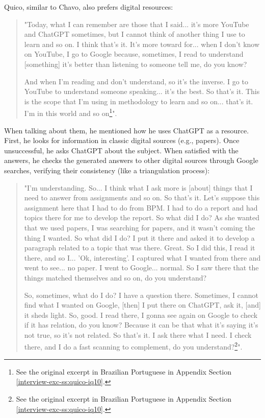 Quico, similar to Chavo, also prefers digital resources:
\begin{quote}
    "Today, what I can remember are those that I said... it's more YouTube and ChatGPT sometimes, but I cannot think of another thing I use to learn and so on. I think that's it. It's more toward for... when I don't know on YouTube, I go to Google because, sometimes, I read to understand [something] it's better than listening to someone tell me, do you know?

    And when I'm reading and don't understand, so it's the inverse. I go to YouTube to understand someone speaking... it's the best. So that's it. This is the scope that I'm using in methodology to learn and so on... that's it. I'm in this world and so on\footnote{See the original excerpt in Brazilian Portuguese in Appendix Section \ref{interview-exc-ss:quico-iq10}.}".
\end{quote}
When talking about them, he mentioned how he uses ChatGPT as a resource. First, he looks for information in classic digital sources (e.g., papers). Once unsuccessful, he asks ChatGPT about the subject. When satisfied with the answers, he checks the generated answers to other digital sources through Google searches, verifying their consistency (like a triangulation process):
\begin{quote}
    "I'm understanding. So... I think what I ask more is [about] things that I need to answer from assignments and so on. So that's it. Let's suppose this assignment here that I had to do from \gls{BPM}. I had to do a report and had topics there for me to develop the report. So what did I do? As she wanted that we used papers, I was searching for papers, and it wasn't coming the thing I wanted. So what did I do? I put it there and asked it to develop a paragraph related to a topic that was there. Great. So I did this, I read it there, and so I... 'Ok, interesting'. I captured what I wanted from there and went to see... no paper. I went to Google... normal. So I saw there that the things matched themselves and so on, do you understand?

    So, sometimes, what do I do? I have a question there. Sometimes, I cannot find what I wanted on Google, [then] I put there on ChatGPT, ask it, [and] it sheds light. So, good. I read there, I gonna see again on Google to check if it has relation, do you know? Because it can be that what it's saying it's not true, so it's not related. So that's it. I ask there what I need. I check there, and I do a fast scanning to complement, do you understand?\footnote{See the original excerpt in Brazilian Portuguese in Appendix Section \ref{interview-exc-ss:quico-iq10}.}".
\end{quote}

